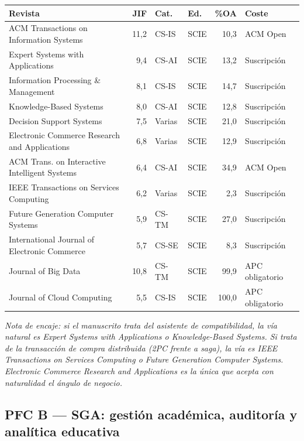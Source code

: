 \documentclass[11pt,a4paper]{article}
\newcommand{\jcrnote}[1]{{\footnotesize\itshape #1}}
\begin{document}
\begin{center}
	\footnotesize
	\begin{longtable}{@{}p{6.2cm}rp{1.2cm}p{1.3cm}rp{3.4cm}@{}}
		\toprule
		\textbf{Revista} & \textbf{JIF} & \textbf{Cat.} & \textbf{Ed.} & \textbf{\%OA} & \textbf{Coste} \\
		\midrule
		\endhead
		ACM Transactions on Information Systems & 11,2 & CS-IS & SCIE & 10,3 & ACM Open \\
		Expert Systems with Applications & 9,4 & CS-AI & SCIE & 13,2 & Suscripción \\
		Information Processing \& Management & 8,1 & CS-IS & SCIE & 14,7 & Suscripción \\
		Knowledge-Based Systems & 8,0 & CS-AI & SCIE & 12,8 & Suscripción \\
		Decision Support Systems & 7,5 & Varias & SCIE & 21,0 & Suscripción \\
		Electronic Commerce Research and Applications & 6,8 & Varias & SCIE & 12,9 & Suscripción \\
		ACM Trans. on Interactive Intelligent Systems & 6,4 & CS-AI & SCIE & 34,9 & ACM Open \\
		IEEE Transactions on Services Computing & 6,2 & Varias & SCIE & 2,3 & Suscripción \\
		Future Generation Computer Systems & 5,9 & CS-TM & SCIE & 27,0 & Suscripción \\
		International Journal of Electronic Commerce & 5,7 & CS-SE & SCIE & 8,3 & Suscripción \\
		\addlinespace
		Journal of Big Data & 10,8 & CS-TM & SCIE & 99,9 & APC obligatorio \\
		Journal of Cloud Computing & 5,5 & CS-IS & SCIE & 100,0 & APC obligatorio \\
		\bottomrule
	\end{longtable}
\end{center}

\jcrnote{Nota de encaje: si el manuscrito trata del asistente de compatibilidad, la vía natural es \emph{Expert Systems with Applications} o \emph{Knowledge-Based Systems}. Si trata de la transacción de compra distribuida (2PC frente a saga), la vía es \emph{IEEE Transactions on Services Computing} o \emph{Future Generation Computer Systems}. \emph{Electronic Commerce Research and Applications} es la única que acepta con naturalidad el ángulo de negocio.}

\subsection{PFC B --- SGA: gestión académica, auditoría y analítica educativa}
\end{document}
